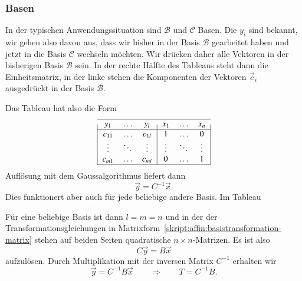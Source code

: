 \subsubsection{Basen}
In der typischen Anwendungssituation sind $\mathcal{B}$ und $\mathcal{C}$
Basen.
Die $y_i$ sind bekannt, wir gehen also davon aus, dass wir bisher in
der Basis $\mathcal{B}$ gearbeitet haben und jetzt in die Basis
$\mathcal{C}$ wechseln möchten.
Wir drücken daher alle Vektoren in der bisherigen Basis $\mathcal{B}$
sein.
In der rechte Hälfte des Tableaus steht dann die Einheitsmatrix, in
der linke stehen die Komponenten der Vektoren $\vec{c}_i$ ausgedrückt
in der Basis $\mathcal{B}$.


Das Tableau hat also die Form
\begin{equation*}
\begin{tabular}{|>{$}c<{$}>{$}c<{$}>{$}c<{$}|>{$}c<{$}>{$}c<{$}>{$}c<{$}|}
\hline
   y_1&\dots &   y_l&   x_1&\dots &   x_n\\
\hline
c_{11}&\dots &c_{1l}&  1   &\dots &  0   \\
\vdots&\ddots&\vdots&\vdots&\ddots&\vdots\\
c_{m1}&\dots &c_{ml}&  0   &\dots &  1   \\
\hline
\end{tabular}
\end{equation*}
Auflösung mit dem Gaussalgorithmus liefert dann
\[
\vec{y} = C^{-1} \vec{x}.
\]
Dies funktionert aber auch für jede beliebige andere Basis.
Im Tableau 

Für eine beliebige Basis ist dann $l=m=n$ und
in der der Transformationsgleichungen
in Matrixform~\ref{skript:affin:basistransformation-matrix}
stehen auf beiden Seiten quadratische $n\times n$-Matrizen.
Es ist also 
\[
C\vec{y} = B\vec{x}
\]
aufzulösen.
Durch Multiplikation mit der inversen Matrix $C^{-1}$ erhalten wir
\begin{equation}
\vec{y} = C^{-1}B\vec{x}
\qquad\Rightarrow\qquad
T=C^{-1}B.
\label{skript:affin:basiswechselt}
\end{equation}

